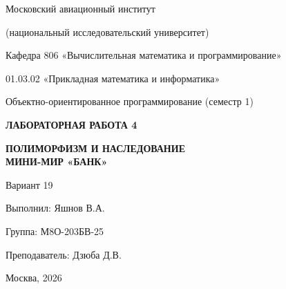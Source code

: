 \begin{titlepage}
\thispagestyle{empty}
\centering

{\Large Московский авиационный институт\par}
{\large (национальный исследовательский университет)\par}

\vspace{0.6cm}

{\large Кафедра 806 «Вычислительная математика и программирование»\par}
\vspace{0.3cm}
{\large 01.03.02 «Прикладная математика и информатика»\par}

\vspace{0.4cm}

{\large Объектно-ориентированное программирование (семестр 1)\par}

\vfill

{\LARGE\bfseries ЛАБОРАТОРНАЯ РАБОТА 4\par}
\vspace{0.4cm}
{\Large\bfseries ПОЛИМОРФИЗМ И НАСЛЕДОВАНИЕ\\[0.2cm]МИНИ-МИР «БАНК»\par}

\vspace{1.4cm}

{\large Вариант 19\par}

\vfill

\begin{flushright}
\begin{minipage}{0.55\textwidth}
Выполнил: Яшнов В.А.

\vspace{0.5cm}

Группа: М8О-203БВ-25

\vspace{0.5cm}

Преподаватель: Дзюба Д.В.
\end{minipage}
\end{flushright}

\vspace{0.8cm}

{\large Москва, 2026\par}

\end{titlepage}

\tableofcontents
\clearpage
{}
\setcounter{page}{2}

